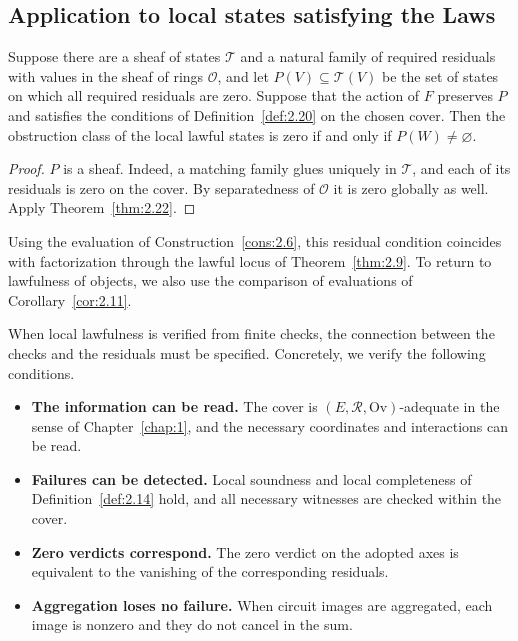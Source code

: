 \subsection*{Application to local states satisfying the Laws}

\begin{corollary}\label{cor:2.23}

Suppose there are a sheaf of states $\mathcal{T}$ and a natural family of required
residuals with values in the sheaf of rings $\mathcal{O}$, and let
$P(V)\subseteq\mathcal{T}(V)$ be the set of states on which all required residuals are
zero. Suppose that the action of $F$ preserves $P$ and satisfies the conditions of
Definition~\ref{def:2.20} on the chosen cover. Then the obstruction class of the local
lawful states is zero if and only if $P(W)\ne\varnothing$.

\end{corollary}

\begin{proof}

$P$ is a sheaf. Indeed, a matching family glues uniquely in $\mathcal{T}$, and each of its
residuals is zero on the cover. By separatedness of $\mathcal{O}$ it is zero globally as
well. Apply Theorem~\ref{thm:2.22}.

\end{proof}

Using the evaluation of Construction~\ref{cons:2.6}, this residual condition coincides
with factorization through the lawful locus of Theorem~\ref{thm:2.9}. To return to
lawfulness of objects, we also use the comparison of evaluations of
Corollary~\ref{cor:2.11}.

When local lawfulness is verified from finite checks, the connection between the checks
and the residuals must be specified. Concretely, we verify the following conditions.

\begin{itemize}
\item \textbf{The information can be read.} The cover is
$(E,\mathcal{R},\mathrm{Ov})$-adequate in the sense of Chapter~\ref{chap:1}, and the
necessary coordinates and interactions can be read.
\item \textbf{Failures can be detected.} Local soundness and local completeness of
Definition~\ref{def:2.14} hold, and all necessary witnesses are checked within the cover.
\item \textbf{Zero verdicts correspond.} The zero verdict on the adopted axes is
equivalent to the vanishing of the corresponding residuals.
\item \textbf{Aggregation loses no failure.} When circuit images are aggregated, each
image is nonzero and they do not cancel in the sum.
\end{itemize}

